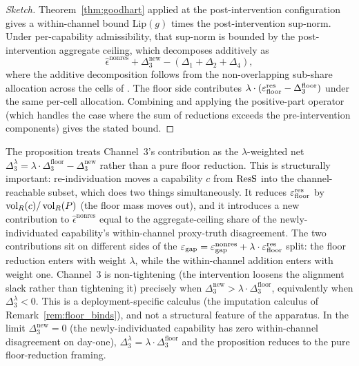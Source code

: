 \begin{proof}[Sketch]
Theorem~\ref{thm:goodhart} applied at the post-intervention
configuration gives a within-channel bound
$\mathrm{Lip}(g)$ times the post-intervention sup-norm.  Under
per-capability admissibility, that sup-norm is bounded by the
post-intervention aggregate ceiling, which decomposes additively
as
\[
  \hat{\epsilon}^{\mathrm{nonres}}
   + \Delta_3^{\mathrm{new}}
   - (\Delta_1 + \Delta_2 + \Delta_4),
\]
where the additive decomposition follows from the
non-overlapping sub-share allocation across the cells of
\citep[Definition~8]{lasser2026paper8b}.  The floor side
contributes $\lambda \cdot (\varepsilon_{\mathrm{floor}}^{\mathrm{res}} - \Delta_3^{\mathrm{floor}})$
under the same per-cell allocation.  Combining and applying the
positive-part operator (which handles the case where the sum of
reductions exceeds the pre-intervention components) gives the
stated bound.
\end{proof}

\begin{remark}
\label{rem:channel3_net}
The proposition treats Channel~3's contribution as the
$\lambda$-weighted net $\Delta_3^{\lambda} = \lambda \cdot
\Delta_3^{\mathrm{floor}} - \Delta_3^{\mathrm{new}}$ rather than
a pure floor reduction.  This is structurally important:
re-individuation moves a capability $c$ from $\mathrm{ResS}$ into the
channel-reachable subset, which does two things simultaneously.
It reduces $\varepsilon_{\mathrm{floor}}^{\mathrm{res}}$ by $\operatorname{vol}_R(c)/\operatorname{vol}_R(P)$ (the floor mass
moves out), and it introduces a new contribution to
$\hat{\epsilon}^{\mathrm{nonres}}$ equal to the
aggregate-ceiling share of the newly-individuated capability's
within-channel proxy-truth disagreement.  The two contributions
sit on different sides of the
$\varepsilon_{\mathrm{gap}} = \varepsilon_{\mathrm{gap}}^{\mathrm{nonres}} + \lambda \cdot \varepsilon_{\mathrm{floor}}^{\mathrm{res}}$ split: the
floor reduction enters with weight $\lambda$, while the
within-channel addition enters with weight one.  Channel~3 is
non-tightening (the intervention loosens the alignment slack
rather than tightening it) precisely when
$\Delta_3^{\mathrm{new}} > \lambda \cdot
\Delta_3^{\mathrm{floor}}$, equivalently when
$\Delta_3^{\lambda} < 0$.  This is a deployment-specific
calculus (the imputation calculus of
Remark~\ref{rem:floor_binds}), and not a structural feature of
the apparatus.  In the limit $\Delta_3^{\mathrm{new}} = 0$
(the newly-individuated capability has zero within-channel
disagreement on day-one), $\Delta_3^{\lambda} = \lambda \cdot
\Delta_3^{\mathrm{floor}}$ and the proposition reduces to the
pure floor-reduction framing.
\end{remark}


